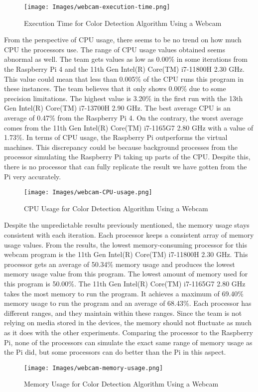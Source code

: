 \begin{figure}
    \centering
    \texttt{[image: Images/webcam-execution-time.png]}
    \caption{Execution Time for Color Detection Algorithm Using a Webcam}
\end{figure}

From the perspective of CPU usage, there seems to be no trend on how much CPU the processors use. The range of CPU usage values obtained seems abnormal as well. The team gets values as low as 0.00\% in some iterations from the Raspberry Pi 4 and the 11th Gen Intel(R) Core(TM) i7-11800H 2.30 GHz. This value could mean that less than 0.005\% of the CPU runs this program in these instances. The team believes that it only shows 0.00\% due to some precision limitations. The highest value is 3.20\% in the first run with the 13th Gen Intel(R) Core(TM) i7-13700H 2.90 GHz. The best average CPU is an average of 0.47\% from the Raspberry Pi 4. On the contrary, the worst average comes from the 11th Gen Intel(R) Core(TM) i7-1165G7 2.80 GHz with a value of 1.73\%. In terms of CPU usage, the Raspberry Pi outperforms the virtual machines. This discrepancy could be because background processes from the processor simulating the Raspberry Pi taking up parts of the CPU. Despite this, there is no processor that can fully replicate the result we have gotten from the Pi very accurately.

\begin{figure}
    \centering
    \texttt{[image: Images/webcam-CPU-usage.png]}
    \caption{CPU Usage for Color Detection Algorithm Using a Webcam}
\end{figure}

Despite the unpredictable results previously mentioned, the memory usage stays consistent with each iteration. Each processor keeps a consistent array of memory usage values. From the results, the lowest memory-consuming processor for this webcam program is the 11th Gen Intel(R) Core(TM) i7-11800H 2.30 GHz. This processor gets an average of 50.34\% memory usage and produces the lowest memory usage value from this program. The lowest amount of memory used for this program is 50.00\%. The 11th Gen Intel(R) Core(TM) i7-1165G7 2.80 GHz takes the most memory to run the program. It achieves a maximum of 69.40\% memory usage to run the program and an average of 68.43\%. Each processor has different ranges, and they maintain within these ranges. Since the team is not relying on media stored in the devices, the memory should not fluctuate as much as it does with the other experiments. Comparing the processor to the Raspberry Pi, none of the processors can simulate the exact same range of memory usage as the Pi did, but some processors can do better than the Pi in this aspect.

\begin{figure}
    \centering
    \texttt{[image: Images/webcam-memory-usage.png]}
    \caption{Memory Usage for Color Detection Algorithm Using a Webcam}
\end{figure}